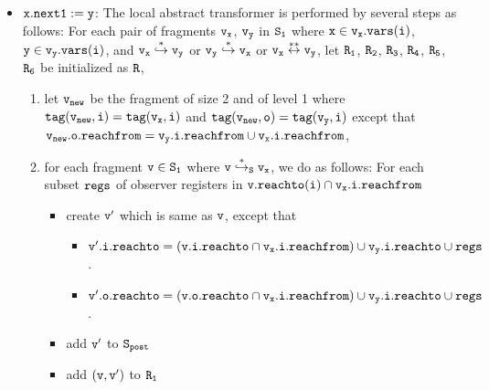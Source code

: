 \begin{itemize}

\item  ${\tt x.next1:= y}$: The local abstract transformer is performed by several steps as follows: For each pair of fragments $\tt v_x$, $\tt v_y$ in $\tt S_1$ where $\tt x \in v_x.{\tt vars}(\tt i)$, $\tt y \in v_y.{\tt vars}(\tt i)$, and $\tt v_x \overset{*}\hookrightarrow v_y$ or $\tt v_y \overset{*}\hookrightarrow v_x$ or $\tt v_x \overset{**}\leftrightarrow v_y$, let $\tt R_1$, $\tt R_2$, $\tt R_3$, $\tt R_4$, $\tt R_5$, $\tt R_6$ be initialized as $\tt R$,  
\begin{enumerate}
\item let $\tt v_{new}$ be the fragment of size 2 and of level 1 where $\tt tag(v_{new},i) = tag(v_x, i)$ and $\tt tag(v_{new},o) = tag(v_y,i)$ except that $\tt v_{new}.o.reachfrom = v_y.i.reachfrom \cup v_x.i.reachfrom$,
\item  for each fragment $\tt v \in S_1$ where $\tt v \overset{*}\hookrightarrow_S v_x$, we do as follows: For each subset $\tt regs$ of observer registers in $\tt v.reachto(\tt i) \cap \tt v_x.i.reachfrom$


\begin{itemize}
\item create $\tt v'$ which is same as $\tt v$, except that
\begin{itemize}
\item $\mathtt{v}'.\mathtt{i}.\mathtt{reachto} = (\tt \mathtt{v}.\mathtt{i}.\mathtt{reachto} \cap v_x.i.reachfrom) \cup v_y.i.reachto \cup regs$.
\item $\mathtt{v}'.\mathtt{o}.\mathtt{reachto} = (\tt \mathtt{v}.\mathtt{o}.\mathtt{reachto} \cap v_x.i.reachfrom) \cup v_y.i.reachto \cup regs$.
\end{itemize}
\item add $\tt v'$ to $\tt S_{post}$ 
\item add $\tt (v,v')$ to $\tt R_1$
\end{itemize}


\end{enumerate}
\end{itemize}
